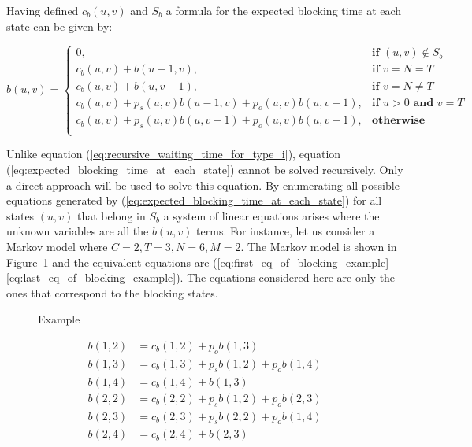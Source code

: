 Having defined \(c_b(u,v)\) and \(S_b\) a formula for the expected blocking time
at each state can be given by:

\small
\begin{equation}\label{eq:expected_blocking_time_at_each_state}
    b(u,v) =
    \begin{cases}
        0, & \textbf{if } (u,v) \notin S_b \\
        c_b(u,v) + b(u - 1, v), & \textbf{if } v = N = T\\
        c_b(u,v) + b(u, v-1), & \textbf{if } v = N \neq T \\
        c_b(u,v) + p_s(u,v) b(u-1, v) + p_o(u,v) b(u, v+1), & \textbf{if } u > 0
        \textbf{ and } v = T \\
        c_b(u,v) + p_s(u,v) b(u, v-1) + p_o(u,v) b(u, v+1), & \textbf{otherwise} \\
    \end{cases}
\end{equation}
\normalsize

Unlike equation (\ref{eq:recursive_waiting_time_for_type_i}), equation
(\ref{eq:expected_blocking_time_at_each_state}) cannot be solved recursively.
Only a direct approach will be used to solve this equation.
By enumerating all possible equations generated by
(\ref{eq:expected_blocking_time_at_each_state}) for all states \((u,v)\) that
belong in \(S_b\) a system of linear equations arises where the unknown
variables are all the \(b(u,v)\) terms.
For instance, let us consider a Markov model where \(C=2, T=3, N=6, M=2\).
The Markov model is shown in Figure~\ref{fig:example_algeb_blocking}
and the equivalent equations are
(\ref{eq:first_eq_of_blocking_example} - \ref{eq:last_eq_of_blocking_example}).
The equations considered here are only the ones that correspond to the blocking
states.

\begin{minipage}{0.45\textwidth}
    \begin{figure}[H]
        \scalebox{0.5}{}
        \caption{Example}
        \label{fig:example_algeb_blocking}
    \end{figure}
\end{minipage}
\begin{minipage}{0.5\textwidth}
    \scriptsize
    \begin{align}
        b(1,2) &= c_b(1,2) + p_o b(1,3) \label{eq:first_eq_of_blocking_example} \\
        b(1,3) &= c_b(1,3) + p_s b(1,2) + p_o b(1,4) \\
        b(1,4) &= c_b(1,4) + b(1,3) \\
        b(2,2) &= c_b(2,2) + p_s b(1,2) + p_o b(2,3) \\
        b(2,3) &= c_b(2,3) + p_s b(2,2) + p_o b(1,4) \\
        b(2,4) &= c_b(2,4) + b(2,3)\label{eq:last_eq_of_blocking_example}
    \end{align}
    \normalsize
\end{minipage}
\vspace{0.5cm}

